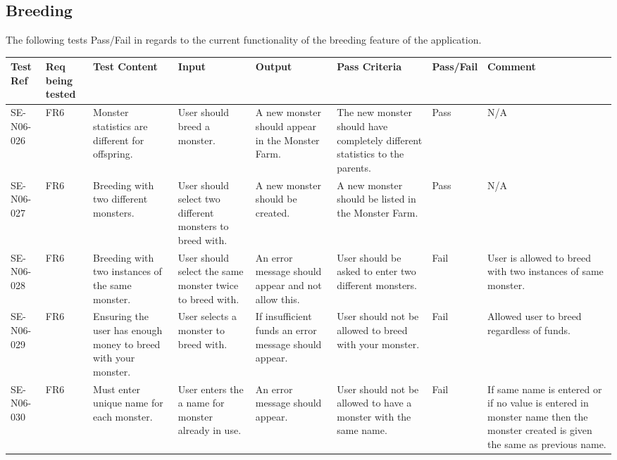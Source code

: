 \documentclass[titlepage]{article}
\begin{document}
{\subsection{Breeding}
The following tests Pass/Fail in regards to the current functionality of the breeding feature of the application.
\\
\begin{sideways}
\begin{tabular}{|p{1cm}|p{1cm}|p{3cm}|p{3cm}|p{2cm}|p{3cm}|p{2cm}|p{3cm}|}
\hline
Test Ref & Req being tested & Test Content & Input & Output & Pass Criteria & Pass/Fail & Comment \\ 
\hline
SE-N06-026 & FR6 & Monster statistics are different for offspring. & User should breed a monster. & A new monster should appear in the Monster Farm. & The new monster should have completely different statistics to the parents. & Pass & N/A \\
\hline
SE-N06-027 & FR6 & Breeding with two different monsters. & User should select two different monsters to breed with. & A new monster should be created. & A new monster should be listed in the Monster Farm. & Pass & N/A \\
\hline
SE-N06-028 & FR6 & Breeding with two instances of the same monster. & User should select the same monster twice to breed with. & An error message should appear and not allow this. & User should be asked to enter two different monsters. & Fail & User is allowed to breed with two instances of same monster.\\
\hline
SE-N06-029 & FR6 & Ensuring the user has enough money to breed with your monster. & User selects a monster to breed with. & If insufficient funds an error message should appear. & User should not be allowed to breed with your monster. & Fail & Allowed user to breed regardless of funds.\\
\hline
SE-N06-030 & FR6 & Must enter unique name for each monster. & User enters the a name for monster already in use. & An error message should appear. & User should not be allowed to have a monster with the same name. & Fail & If same name is entered or if no value is entered in monster name then the monster created is given the same as previous name.\\
\hline
\end{tabular}
\end{sideways}
}
\end{document}
